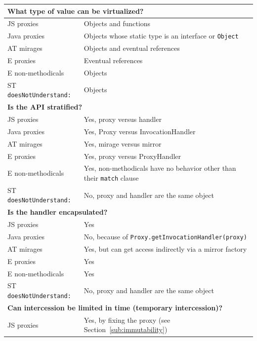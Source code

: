 \documentclass{sig-alternate}
\begin{document}
\begin{table}
\centering
\begin{tabular}{|p{}|p{}|}
    \hline
    \multicolumn{2}{|l|}{\textbf{What type of value can be virtualized?}}\\
    \hline
    JS proxies        & Objects and functions\\
    Java proxies      & Objects whose static type is an interface or \texttt{Object}\\
    AT mirages        & Objects and eventual references\\
    E proxies         & Eventual references\\
    E non-methodicals & Objects\\
    ST \texttt{doesNotUnderstand:}  & Objects\\
    \hline
    \multicolumn{2}{|l|}{\textbf{Is the API stratified?}}\\
    \hline
    JS proxies        & Yes, proxy versus handler\\
    Java proxies      & Yes, Proxy versus InvocationHandler\\
    AT mirages        & Yes, mirage versus mirror\\
    E proxies         & Yes, proxy versus ProxyHandler\\
    E non-methodicals & Yes, non-methodicals have no behavior other than their \texttt{match} clause\\
    ST \texttt{doesNotUnderstand:}  & No, proxy and handler are the same object\\
    \hline
    \multicolumn{2}{|l|}{\textbf{Is the handler encapsulated?}}\\
    \hline
    JS proxies        & Yes\\
    Java proxies      & No, because of \texttt{Proxy.getInvocationHandler(proxy)}\\
    AT mirages        & Yes, but can get access indirectly via a mirror factory\\
    E proxies         & Yes\\
    E non-methodicals & Yes\\
    ST \texttt{doesNotUnderstand:}  & No, proxy and handler are the same object\\
    \hline
    \multicolumn{2}{|l|}{\textbf{Can intercession be limited in time (temporary intercession)?}}\\
    \hline
    JS proxies        & Yes, by fixing the proxy (see Section~\ref{sub:immutability})\\

\end{tabular}
\end{table}
\end{document}
